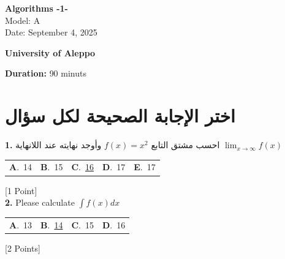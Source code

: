 \documentclass[12pt]{article}
\newcommand{\choice}[2]{\textbf{#1}.~#2}
\begin{document}
\begin{flushright}
{\Large \textbf{{\textenglish{Algorithms -1-}}}}\\[0.25em]
{\normalsize \textenglish{Model: }{\textenglish{A}}}\\[0.1em]
{\normalsize \textenglish{Date: }{\textenglish{September 4, 2025}}}
\end{flushright}

\vspace{0.6cm}

\noindent
\begin{minipage}[t]{0.65\textwidth}
  \raggedright
  \textbf{{\textenglish{University of Aleppo}}}\\[0.3em]
\end{minipage}\hfill
\begin{minipage}[t]{0.3\textwidth}
  \raggedleft
  \textenglish{\textbf{Duration: }}{\textenglish{90 minuts}}
\end{minipage}

\vspace{0.9cm}

\section*{اختر الإجابة الصحيحة لكل سؤال}

\noindent \textbf{\textenglish{1.}} {\textarabic{احسب مشتق التابع }}\( f(x) = x^2\){\textarabic{ وأوجد نهايته عند اللانهاية }}\(\lim_{x \to \infty}f(x)\)

\begin{tabularx}{\linewidth}{@{}*{5}{Y}@{}}
\choice{A}{{{\textenglish{14}}}} & \choice{B}{{{\textenglish{15}}}} & \choice{C}{{\underline{{\textenglish{16}}}}} & \choice{D}{{{\textenglish{17}}}} & \choice{E}{{{\textenglish{17}}}} \\
\end{tabularx}
\hfill {\textenglish{[1 Point]}}\\[0.5em]

\noindent \textbf{\textenglish{2.}} {\textenglish{Please calculate }}\(\int f(x)dx\)

\begin{tabularx}{\linewidth}{@{}*{4}{Y}@{}}
\choice{A}{{{\textenglish{13}}}} & \choice{B}{{\underline{{\textenglish{14}}}}} & \choice{C}{{{\textenglish{15}}}} & \choice{D}{{{\textenglish{16}}}} \\
\end{tabularx}
\hfill {\textenglish{[2 Points]}}\\[0.5em]
\end{document}
